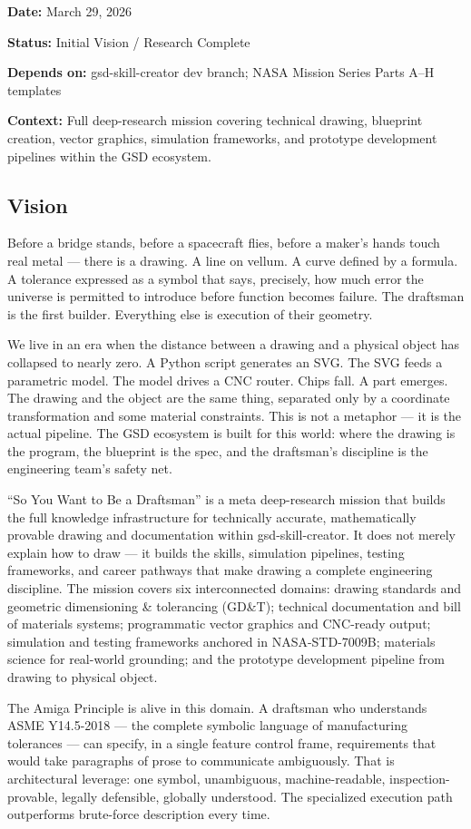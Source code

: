 \documentclass[11pt,letterpaper]{article}
\newcommand{\metafield}[2]{\textbf{\sffamily #1} #2\par}
\begin{document}
\metafield{Date:}{March 29, 2026}
\metafield{Status:}{Initial Vision / Research Complete}
\metafield{Depends on:}{gsd-skill-creator dev branch; NASA Mission Series Parts A--H templates}
\metafield{Context:}{Full deep-research mission covering technical drawing, blueprint creation, vector graphics, simulation frameworks, and prototype development pipelines within the GSD ecosystem.}

\subsection{Vision}

Before a bridge stands, before a spacecraft flies, before a maker's hands touch real metal --- there is a drawing. A line on vellum. A curve defined by a formula. A tolerance expressed as a symbol that says, precisely, how much error the universe is permitted to introduce before function becomes failure. The draftsman is the first builder. Everything else is execution of their geometry.

We live in an era when the distance between a drawing and a physical object has collapsed to nearly zero. A Python script generates an SVG. The SVG feeds a parametric model. The model drives a CNC router. Chips fall. A part emerges. The drawing and the object are the same thing, separated only by a coordinate transformation and some material constraints. This is not a metaphor --- it is the actual pipeline. The GSD ecosystem is built for this world: where the drawing is the program, the blueprint is the spec, and the draftsman's discipline is the engineering team's safety net.

``So You Want to Be a Draftsman'' is a meta deep-research mission that builds the full knowledge infrastructure for technically accurate, mathematically provable drawing and documentation within gsd-skill-creator. It does not merely explain how to draw --- it builds the skills, simulation pipelines, testing frameworks, and career pathways that make drawing a complete engineering discipline. The mission covers six interconnected domains: drawing standards and geometric dimensioning \& tolerancing (GD\&T); technical documentation and bill of materials systems; programmatic vector graphics and CNC-ready output; simulation and testing frameworks anchored in NASA-STD-7009B; materials science for real-world grounding; and the prototype development pipeline from drawing to physical object.

The Amiga Principle is alive in this domain. A draftsman who understands ASME Y14.5-2018 --- the complete symbolic language of manufacturing tolerances --- can specify, in a single feature control frame, requirements that would take paragraphs of prose to communicate ambiguously. That is architectural leverage: one symbol, unambiguous, machine-readable, inspection-provable, legally defensible, globally understood. The specialized execution path outperforms brute-force description every time.
\end{document}
